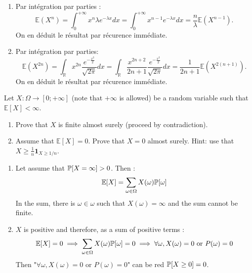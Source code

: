 \begin{solution}
  \begin{enumerate}
    \item Par int\'{e}gration par parties :
          \[
            \mathbb{E}\left(X^{n}\right) = \int_{0}^{+\infty}x^{n}\lambda e^{-\lambda x}dx = \int_{0}^{+\infty}x^{n-1} e^{-\lambda x}dx = \frac{n}{\lambda}\mathbb{E}\left(X^{n-1}\right).
          \]
          On en d\'{e}duit le r\'{e}sultat par r\'{e}curence imm\'{e}diate.
    \item Par int\'{e}gration par parties:
          \[
            \mathbb{E}\left(X^{2n}\right) = \int_{\mathbb{R}}x^{2n}\frac{e^{-\frac{x^2}{2}}}{\sqrt{2\pi}}dx = \int_{\mathbb{R}}\frac{x^{2n+2}}{2n + 1}\frac{e^{-\frac{x^2}{2}}}{\sqrt{2\pi}}dx = \frac{1}{2n+1}\mathbb{E}\left(X^{2(n+1)}\right).
          \]
          On en d\'{e}duit le r\'{e}sultat par r\'{e}curence imm\'{e}diate.
  \end{enumerate}
\end{solution}

\begin{Exercise}
  Let $X: \Omega \rightarrow[0 ;+\infty]$ (note that $+\infty$ is allowed) be a random variable such that $\mathbb{E}[X]<\infty$.

  \begin{enumerate}
    \item Prove that $X$ is finite almost surely (proceed by contradiction).

    \item Assume that $\mathbb{E}[X]=0$. Prove that $X=0$ almost surely. Hint: use that $X \geq \frac{1}{n} \mathbf{1}_{X \geq 1 / n}$.
  \end{enumerate}
\end{Exercise}

\begin{solution}
  \begin{enumerate}
    \item Let assume that $\mathbb{P}[X = \infty] > 0$. Then :
          $$\mathbb{E}[X] = \sum_{\omega \in \Omega} X(\omega) \mathbb{P}[\omega]$$
          In the sum, there is $\omega \in \omega$ such that $X(\omega) = \infty$ and the sum cannot be finite.
    \item $X$ is positive and therefore, as a sum of positive terms :
          $$\mathbb{E}[X] = 0 \implies \sum_{\omega \in \Omega} X(\omega) \mathbb{P}[\omega] = 0 \implies \forall \omega, X(\omega) = 0 \text{ or } P(\omega) = 0$$
          Then "$\forall \omega, X(\omega) = 0 \text{ or } P(\omega) = 0$" can be red $\mathbb{P}[X \geq 0] = 0$.
  \end{enumerate}
\end{solution}